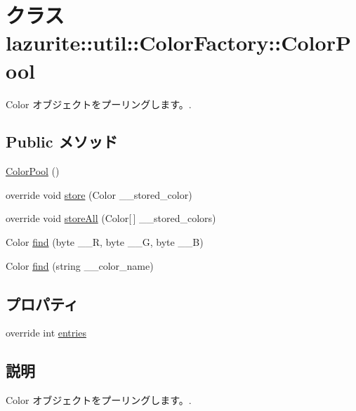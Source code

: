 \hypertarget{classlazurite_1_1util_1_1_color_factory_1_1_color_pool}{
\section{クラス lazurite::util::ColorFactory::ColorPool}
\label{classlazurite_1_1util_1_1_color_factory_1_1_color_pool}
}


Color オブジェクトをプーリングします。.  
\subsection*{Public メソッド}
\begin{DoxyCompactItemize}
\item 
\hyperlink{classlazurite_1_1util_1_1_color_factory_1_1_color_pool_a3c8dcf68b1ba944832f21347a25e2b92}{ColorPool} ()
\item 
override void \hyperlink{classlazurite_1_1util_1_1_color_factory_1_1_color_pool_a6b5091afd3c6a7e5b5446e409bf32545}{store} (Color \_\-\_\-stored\_\-color)
\item 
override void \hyperlink{classlazurite_1_1util_1_1_color_factory_1_1_color_pool_a638b1ec4359510df77b264c30184105e}{storeAll} (Color\mbox{[}$\,$\mbox{]} \_\-\_\-stored\_\-colors)
\item 
Color \hyperlink{classlazurite_1_1util_1_1_color_factory_1_1_color_pool_ac163ca2ed2b175b96227b93b93790c0e}{find} (byte \_\-\_\-R, byte \_\-\_\-G, byte \_\-\_\-B)
\item 
Color \hyperlink{classlazurite_1_1util_1_1_color_factory_1_1_color_pool_a5d29ef5dd3643fbdcfff66310a22d775}{find} (string \_\-\_\-color\_\-name)
\end{DoxyCompactItemize}
\subsection*{プロパティ}
\begin{DoxyCompactItemize}
\item 
override int \hyperlink{classlazurite_1_1util_1_1_color_factory_1_1_color_pool_ad14f188efe24f769e442a76dffed224e}{entries}
\end{DoxyCompactItemize}


\subsection{説明}
Color オブジェクトをプーリングします。. 

